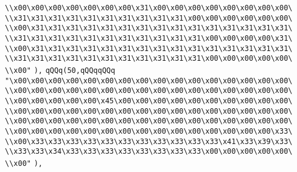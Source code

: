 \verb|\\x00\x00\x00\x00\x00\x00\x00\x31\x00\x00\x00\x00\x00\x00\x00\x00\|\newline
\verb|\\x31\x31\x31\x31\x31\x31\x31\x31\x31\x31\x00\x00\x00\x00\x00\x00\|\newline
\verb|\\x00\x31\x31\x31\x31\x31\x31\x31\x31\x31\x31\x31\x31\x31\x31\x31\|\newline
\verb|\\x31\x31\x31\x31\x31\x31\x31\x31\x31\x31\x31\x00\x00\x00\x00\x31\|\newline
\verb|\\x00\x31\x31\x31\x31\x31\x31\x31\x31\x31\x31\x31\x31\x31\x31\x31\|\newline
\verb|\\x31\x31\x31\x31\x31\x31\x31\x31\x31\x31\x31\x00\x00\x00\x00\x00\|\newline
\verb|\\x00"|\newline
\verb|),|\newline
\verb|qQQq(50,qQQqqQQq|\newline
\verb|"\x00\x00\x00\x00\x00\x00\x00\x00\x00\x00\x00\x00\x00\x00\x00\x00\|\newline
\verb|\\x00\x00\x00\x00\x00\x00\x00\x00\x00\x00\x00\x00\x00\x00\x00\x00\|\newline
\verb|\\x00\x00\x00\x00\x00\x45\x00\x00\x00\x00\x00\x00\x00\x00\x00\x00\|\newline
\verb|\\x00\x00\x00\x00\x00\x00\x00\x00\x00\x00\x00\x00\x00\x00\x00\x00\|\newline
\verb|\\x00\x00\x00\x00\x00\x00\x00\x00\x00\x00\x00\x00\x00\x00\x00\x00\|\newline
\verb|\\x00\x00\x00\x00\x00\x00\x00\x00\x00\x00\x00\x00\x00\x00\x00\x33\|\newline
\verb|\\x00\x33\x33\x33\x33\x33\x33\x33\x33\x33\x33\x33\x41\x33\x39\x33\|\newline
\verb|\\x33\x33\x34\x33\x33\x33\x33\x33\x33\x33\x33\x00\x00\x00\x00\x00\|\newline
\verb|\\x00"|\newline
\verb|),|\newline
